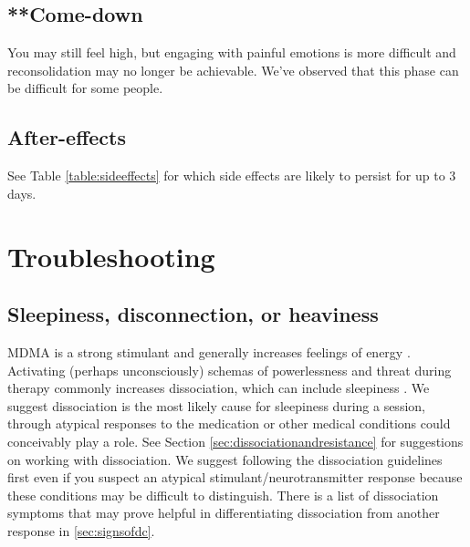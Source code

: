 \documentclass[12pt,letterpaper]{book}
\begin{document}
\subsection*{**Come-down} You may still feel high, but engaging with painful emotions is more difficult and reconsolidation may no longer be achievable. We've observed that this phase can be difficult for some people. 

\subsection*{After-effects}
\label{after}
See Table \ref{table:sideeffects} for which side effects are likely to persist for up to 3 days.

\section{Troubleshooting}
\label{sec:troubleshooting}
\subsection*{Sleepiness, disconnection, or heaviness}
MDMA is a strong stimulant and generally increases feelings of energy \cite{vizeliActuteEffects}. Activating (perhaps unconsciously) schemas of powerlessness and threat during therapy commonly increases dissociation, which can include sleepiness \cite{kozlowskaDefenseCascade}. We suggest dissociation is the most likely cause for sleepiness during a session, through atypical responses to the medication or other medical conditions could conceivably play a role. See Section \ref{sec:dissociationandresistance} for suggestions on working with dissociation. We suggest following the dissociation guidelines first even if you suspect an atypical stimulant/neurotransmitter response because these conditions may be difficult to distinguish. There is a list of dissociation symptoms that may prove helpful in differentiating dissociation from another response in \ref{sec:signsofdc}.
\end{document}
